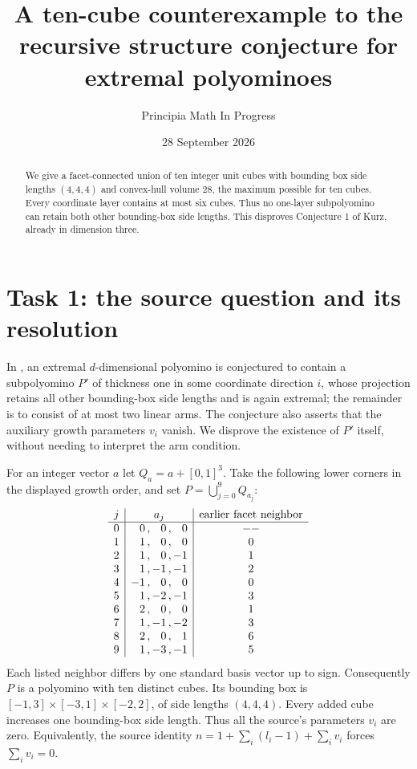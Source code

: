 \documentclass[11pt]{article}
\title{A ten-cube counterexample to the recursive structure conjecture for extremal polyominoes}
\author{Principia Math In Progress}
\date{28 September 2026}
\begin{document}
\maketitle
\begin{abstract}
We give a facet-connected union of ten integer unit cubes with bounding
box side lengths $(4,4,4)$ and convex-hull volume $28$, the maximum possible
for ten cubes. Every coordinate layer contains at most six cubes. Thus no
one-layer subpolyomino can retain both other bounding-box side lengths.
This disproves Conjecture 1 of Kurz, already in dimension three.
\end{abstract}

\section*{Task 1: the source question and its resolution}
In \cite[Conjecture 1, p.~135]{Kurz}, an extremal $d$-dimensional
polyomino is conjectured to contain a subpolyomino $P'$ of thickness one
in some coordinate direction $i$, whose projection retains all other
bounding-box side lengths and is again extremal; the remainder is to
consist of at most two linear arms. The conjecture also asserts that the
auxiliary growth parameters $v_i$ vanish. We disprove the existence of
$P'$ itself, without needing to interpret the arm condition.

For an integer vector $a$ let $Q_a=a+[0,1]^3$. Take the following lower
corners in the displayed growth order, and set $P=\bigcup_{j=0}^9Q_{a_j}$:
\begin{equation}\label{cells}
\begin{array}{c|r@{\,,\,}r@{\,,\,}r|c}
j&\multicolumn{3}{c|}{a_j}&\text{earlier facet neighbor}\\ \hline
0&0&0&0&--\\
1&1&0&0&0\\
2&1&0&-1&1\\
3&1&-1&-1&2\\
4&-1&0&0&0\\
5&1&-2&-1&3\\
6&2&0&0&1\\
7&1&-1&-2&3\\
8&2&0&1&6\\
9&1&-3&-1&5
\end{array}
\end{equation}
Each listed neighbor differs by one standard basis vector up to sign.
Consequently $P$ is a polyomino with ten distinct cubes. Its bounding
box is $[-1,3]\times[-3,1]\times[-2,2]$, of side lengths $(4,4,4)$.
Every added cube increases one bounding-box side length. Thus all the
source's parameters $v_i$ are zero. Equivalently, the source identity
$n=1+\sum_i(l_i-1)+\sum_i v_i$ forces $\sum_i v_i=0$.
\end{document}
